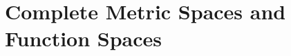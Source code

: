 \documentclass[../main.tex]{subfiles}
\begin{document}
\chapter{Complete Metric Spaces and Function Spaces}
%
\todo{}
\end{document}
